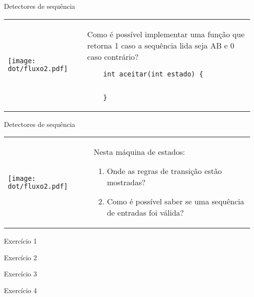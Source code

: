 \documentclass{beamer}
\begin{document}
\begin{frame}[fragile]{Detectores de sequência}
  \centering
  \large
  \begin{tabular}{l m{8cm}}
    \begin{minipage}{.3\textwidth}
      \texttt{[image: dot/fluxo2.pdf]}
    \end{minipage}
  &
    Como é possível implementar uma função que retorna 1 caso a sequência lida
    seja AB e 0 caso contrário?
    \begin{verbatim}
    int aceitar(int estado) {


    }

    \end{verbatim}
    \\
  \end{tabular}
\end{frame}



\begin{frame}[fragile]{Detectores de sequência}
  \centering
  \large
  \begin{tabular}{l m{8cm}}
    \begin{minipage}{.3\textwidth}
   \texttt{[image: dot/fluxo2.pdf]}
    \end{minipage}
  &
    Nesta máquina de estados:
    \begin{enumerate}
    \item Onde as regras de transição estão mostradas?
    \item Como é possível saber se uma sequência de entradas foi válida?
    \end{enumerate}
    \\
  \end{tabular}
\end{frame}

\begin{frame}[fragile]{Exercício 1}
  \centering
  \large

\end{frame}
\begin{frame}[fragile]{Exercício 2}
  \centering
  \large

\end{frame}

\begin{frame}[fragile]{Exercício 3}
  \centering
  \large

\end{frame}

\begin{frame}[fragile]{Exercício 4}
  \centering
  \large

\end{frame}
\end{document}
